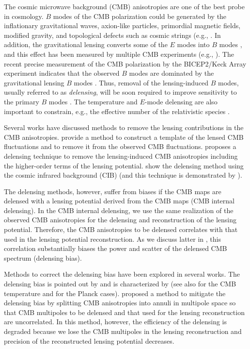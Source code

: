 \documentclass[aps,prd,twocolumn,superscriptaddress,groupedaddress,nofootinbib]{revtex4}
\begin{document}
The cosmic microwave background (CMB) anisotropies are one of the best probe in cosmology. 
$B$ modes of the CMB polarization could be generated by the inflationary gravitational waves, 
axion-like particles, primordial magnetic fields, modified gravity, and 
topological defects such as cosmic strings 
(e.g., . 
In addition, the gravitational lensing converts some of the $E$ modes into $B$ modes \cite{Zaldarriaga:1998ar}, 
and this effect has been measured by multiple CMB experiments 
(e.g., ). 
The recent precise measurement of the CMB polarization by the BICEP2/Keck Array experiment indicates that 
the observed $B$ modes are dominated by the gravitational lensing $B$ modes \cite{BKVIII}. 
Thus, removal of the lensing-induced $B$ modes, usually referred to as {\it delensing}, 
will be soon required to improve sensitivity to the primary $B$ modes \cite{Kesden:2002ku,Knox:2002pe}.
The temperature and $E$-mode delensing are also important to constrain, e.g., 
the effective number of the relativistic species \cite{Green:2016}. 

Several works have discussed methods to remove the lensing contributions in the CMB anisotropies. 
 provide a method to construct a template of the lensed CMB fluctuations 
and to remove it from the observed CMB fluctuations. 
 proposes a delensing technique to remove the lensing-induced CMB anisotropies 
including the higher-order terms of the lensing potential. 
 show the delensing method using the cosmic infrared background (CIB) 
(and this technique is demonstrated by ).

The delensing methods, however, suffer from biases if the CMB maps are delensed with 
a lensing potential derived from the CMB maps (CMB internal delensing). 
In the CMB internal delensing, we use the same realization of the observed CMB anisotropies for 
the delensing and reconstruction of the lensing potential. 
Therefore, the CMB anisotropies to be delensed correlates with that used in 
the lensing potential reconstruction. 
As we discuss latter in , this correlation substantially biases the power and scatter of 
the delensed CMB spectrum (delensing bias).

Methods to correct the delensing bias have been explored in several works. 
The delensing bias is pointed out by  and is characterized by  
(see also  for the CMB temperature and  for the Planck cases). 
 proposed a method to mitigate the delensing bias by 
splitting CMB anisotropies into annuli in multipole space so that CMB multipoles to be delensed and 
that used for the lensing reconstruction are uncorrelated. 
In this method, however, the efficiency of the delensing is degraded 
because we lose the CMB multipoles in the lensing reconstruction and 
precision of the reconstructed lensing potential decreases. 
\end{document}
